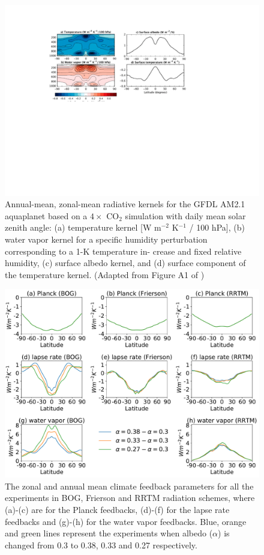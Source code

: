 \begin{figure}[tbhp] %
	\centering
	\includegraphics[width=.8\linewidth]{figs/polar_amp/Feldl2017}
	\caption{Annual-mean, zonal-mean radiative kernels for
		the GFDL AM2.1 aquaplanet based on a $4\times$ CO$_2$ simulation with daily mean solar zenith angle: (a) temperature kernel [W m$^{-2}$ K$^{-1}$ / 100 hPa], (b) water vapor kernel for a specific humidity perturbation corresponding to a 1-K temperature in- crease and fixed relative humidity, (c) surface albedo kernel, and (d) surface component of the temperature kernel. (Adapted from Figure A1 of \cite{Feldl2017})}
	\label{fig:feldl_gfdl_am2.1_kernel}
\end{figure}

\begin{figure}[tbhp]
	\centering
	\includegraphics[width=1\textwidth]{figs/polar_amp/all_zonalmean_feedbacks}
	\caption{The zonal and annual mean climate feedback parameters for all the experiments in BOG, Frierson and RRTM radiation schemes, where (a)-(c) are for the Planck feedbacks, (d)-(f) for the lapse rate feedbacks and (g)-(h) for the water vapor feedbacks. Blue, orange and green lines represent the experiments when albedo ($\alpha$) is changed from 0.3 to 0.38, 0.33 and 0.27 respectively.}
	\label{fig:all_feedbacks}
\end{figure}


